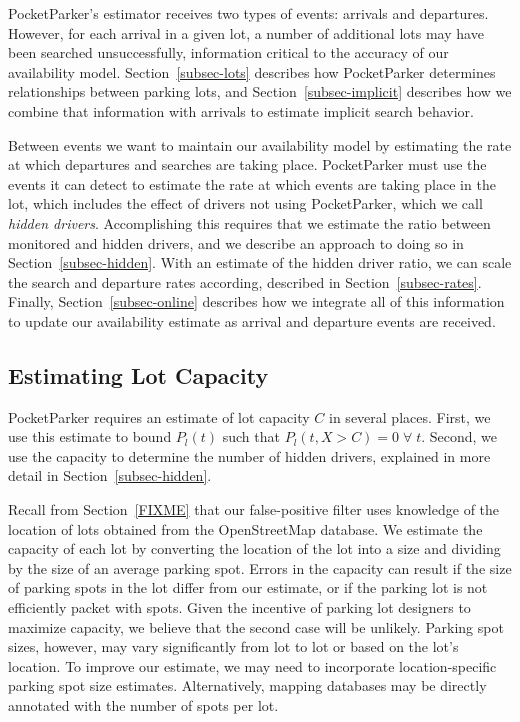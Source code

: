 PocketParker's estimator receives two types of events: arrivals and
departures. However, for each arrival in a given lot, a number of additional
lots may have been searched unsuccessfully, information critical to the
accuracy of our availability model. Section~\ref{subsec-lots} describes how
PocketParker determines relationships between parking lots, and
Section~\ref{subsec-implicit} describes how we combine that information with
arrivals to estimate implicit search behavior.

Between events we want to maintain our availability model by estimating the
rate at which departures and searches are taking place. PocketParker must use
the events it can detect to estimate the rate at which events are taking
place in the lot, which includes the effect of drivers not using
PocketParker, which we call \textit{hidden drivers}. Accomplishing this
requires that we estimate the ratio between monitored and hidden drivers, and
we describe an approach to doing so in Section~\ref{subsec-hidden}. With an
estimate of the hidden driver ratio, we can scale the search and departure
rates according, described in Section~\ref{subsec-rates}. Finally,
Section~\ref{subsec-online} describes how we integrate all of this
information to update our availability estimate as arrival and departure
events are received.

\subsection{Estimating Lot Capacity}
\label{subsec-capacity}

PocketParker requires an estimate of lot capacity $C$ in several places.
First, we use this estimate to bound $P_l(t)$ such that $P_l(t, X > C) =
0\;\forall\;t$. Second, we use the capacity to determine the number of hidden
drivers, explained in more detail in Section~\ref{subsec-hidden}.

Recall from Section~\ref{FIXME} that our false-positive filter uses knowledge
of the location of lots obtained from the OpenStreetMap database. We estimate
the capacity of each lot by converting the location of the lot into a size
and dividing by the size of an average parking spot.  Errors in the capacity can result
if the size of parking spots in the lot differ from our estimate, or if the
parking lot is not efficiently packet with spots. Given the incentive of
parking lot designers to maximize capacity, we believe that the second case
will be unlikely. Parking spot sizes, however, may vary significantly from
lot to lot or based on the lot's location. To improve our estimate, we may
need to incorporate location-specific parking spot size estimates.
Alternatively, mapping databases may be directly annotated with the number of
spots per lot.

